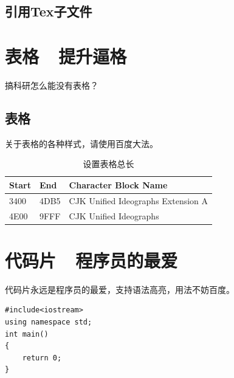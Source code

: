 \documentclass[zihao=-4]{ctexart}
\begin{document}
\subsection{引用Tex子文件}






\clearpage
\section{表格\ \ 提升逼格}

搞科研怎么能没有表格？\\

\subsection{表格}

关于表格的各种样式，请使用百度大法。\\
\begin{table}[H]
\caption{设置表格总长} 
\begin{tabular*}{12cm}{lll}
\hline  
Start & End  & Character Block Name \\  
\hline  
3400  & 4DB5 & CJK Unified Ideographs Extension A \\  
4E00  & 9FFF & CJK Unified Ideographs \\  
\hline  
\end{tabular*} 
\end{table} 



\section{代码片\ \ 程序员的最爱}
代码片永远是程序员的最爱，支持语法高亮，用法不妨百度。\\
\lstset{language=C}
\begin{lstlisting}
#include<iostream>
using namespace std;
int main()
{
    return 0;
}
\end{lstlisting}
\end{document}
